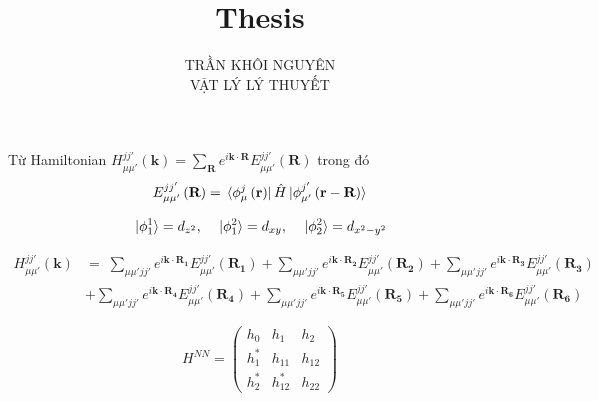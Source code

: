 \documentclass{report}
\title{\Huge{Thesis}}
\begin{document}
\setlength{\parindent}{20pt}
\newpage
\author{TRẦN KHÔI NGUYÊN \\ VẬT LÝ LÝ THUYẾT}
\maketitle

\clearpage


Từ Hamiltonian $H^{jj'}_{\mu\mu'} \left( \mathbf{k}\right) = \sum_{\mathbf{R}}
	e^{i \mathbf{k\cdot R}} E^{jj'}_{\mu\mu'} \left(\textbf{R}\right) $ trong đó
\begin{align*}
	E^{jj'}_{\mu\mu'} \left(\textbf{R}\right) = \bra*{\phi^j_\mu \left(\textbf{r}\right)}\hat{H}\ket*{\phi^{j'}_{\mu'}\left(\textbf{r} - \textbf{R}\right)}
\end{align*}

\begin{align*}
	\ket*{\phi^1_1} = d_{z^2} , \quad \ket*{\phi^2_1} = d_{xy} , \quad \ket*{\phi^2_2} = d_{x^2 - y^2}
\end{align*}

\begin{align*}
	H^{jj'}_{\mu\mu'} \left( \mathbf{k}\right) & =  \; \sum_{\mu\mu' jj'} e^{i \mathbf{k\cdot R_1}} E^{jj'}_{\mu\mu'} \left(\mathbf{R_1}\right)
	+ \sum_{\mu\mu' jj'} e^{i \mathbf{k\cdot R_2}} E^{jj'}_{\mu\mu'} \left(\mathbf{R_2}\right)
	+ \sum_{\mu\mu' jj'} e^{i \mathbf{k\cdot R_3}} E^{jj'}_{\mu\mu'} \left(\mathbf{R_3}\right)                                                  \\
	                                           & + \sum_{\mu\mu' jj'} e^{i \mathbf{k\cdot R_4}} E^{jj'}_{\mu\mu'} \left(\mathbf{R_4}\right)
	+ \sum_{\mu\mu' jj'} e^{i \mathbf{k\cdot R_5}} E^{jj'}_{\mu\mu'} \left(\mathbf{R_5}\right)
	+ \sum_{\mu\mu' jj'} e^{i \mathbf{k\cdot R_6}} E^{jj'}_{\mu\mu'} \left(\mathbf{R_6}\right)
\end{align*}

\[
	\renewcommand{\arraystretch}{0.75}
	H^{NN} = \begin{pmatrix}
		h_{0}   & h_{1}    & h_{2}  \\
		h_{1}^* & h_{11}   & h_{12} \\
		h_{2}^* & h_{12}^* & h_{22}
	\end{pmatrix}
\]
\end{document}
